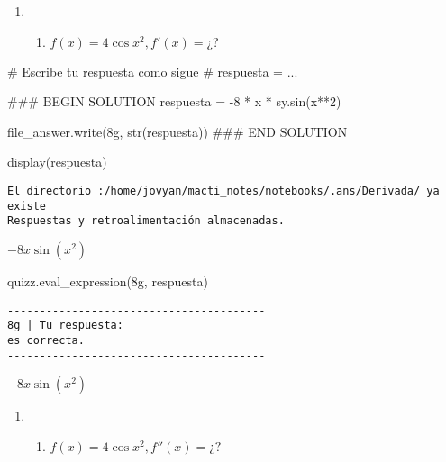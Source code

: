 \documentclass[
  letterpaper,
  DIV=11,
  numbers=noendperiod]{scrreprt}
\newenvironment{Shaded}{\begin{snugshade}}{\end{snugshade}}
\newcommand{\BuiltInTok}[1]{\textcolor[rgb]{0.00,0.23,0.31}{#1}}
\newcommand{\CommentTok}[1]{\textcolor[rgb]{0.37,0.37,0.37}{#1}}
\newcommand{\DecValTok}[1]{\textcolor[rgb]{0.68,0.00,0.00}{#1}}
\newcommand{\NormalTok}[1]{\textcolor[rgb]{0.00,0.23,0.31}{#1}}
\newcommand{\OperatorTok}[1]{\textcolor[rgb]{0.37,0.37,0.37}{#1}}
\newcommand{\RegionMarkerTok}[1]{\textcolor[rgb]{0.00,0.23,0.31}{#1}}
\newcommand{\StringTok}[1]{\textcolor[rgb]{0.13,0.47,0.30}{#1}}
\providecommand{\tightlist}{%
  \setlength{\itemsep}{0pt}\setlength{\parskip}{0pt}}\usepackage{longtable,booktabs,array}
\begin{document}
\begin{enumerate}
\def\labelenumi{\arabic{enumi}.}
\setcounter{enumi}{7}
\tightlist
\item
  \begin{enumerate}
  \def\labelenumii{\alph{enumii}.}
  \setcounter{enumii}{6}
  \tightlist
  \item
    \(f(x) = 4 \cos x^2, f'(x) = ¿?\)
  \end{enumerate}
\end{enumerate}

\begin{Shaded}
\begin{Highlighting}[]
\CommentTok{\# Escribe tu respuesta como sigue }
\CommentTok{\# respuesta = ...}

\CommentTok{\#\#\# }\RegionMarkerTok{BEGIN}\CommentTok{ SOLUTION}
\NormalTok{respuesta }\OperatorTok{=} \OperatorTok{{-}}\DecValTok{8} \OperatorTok{*}\NormalTok{ x }\OperatorTok{*}\NormalTok{ sy.sin(x}\OperatorTok{**}\DecValTok{2}\NormalTok{)}

\NormalTok{file\_answer.write(}\StringTok{\textquotesingle{}8g\textquotesingle{}}\NormalTok{, }\BuiltInTok{str}\NormalTok{(respuesta))}
\CommentTok{\#\#\# }\RegionMarkerTok{END}\CommentTok{ SOLUTION}

\NormalTok{display(respuesta)}
\end{Highlighting}
\end{Shaded}

\begin{verbatim}
El directorio :/home/jovyan/macti_notes/notebooks/.ans/Derivada/ ya existe
Respuestas y retroalimentación almacenadas.
\end{verbatim}

$\displaystyle - 8 x \sin{\left(x^{2} \right)}$

\begin{Shaded}
\begin{Highlighting}[]
\NormalTok{quizz.eval\_expression(}\StringTok{\textquotesingle{}8g\textquotesingle{}}\NormalTok{, respuesta)}
\end{Highlighting}
\end{Shaded}

\begin{verbatim}
----------------------------------------
8g | Tu respuesta:
es correcta.
----------------------------------------
\end{verbatim}

$\displaystyle - 8 x \sin{\left(x^{2} \right)}$

\begin{enumerate}
\def\labelenumi{\arabic{enumi}.}
\setcounter{enumi}{7}
\tightlist
\item
  \begin{enumerate}
  \def\labelenumii{\alph{enumii}.}
  \setcounter{enumii}{7}
  \tightlist
  \item
    \(f(x) = 4 \cos x^2, f''(x) = ¿?\)
  \end{enumerate}
\end{enumerate}
\end{document}
